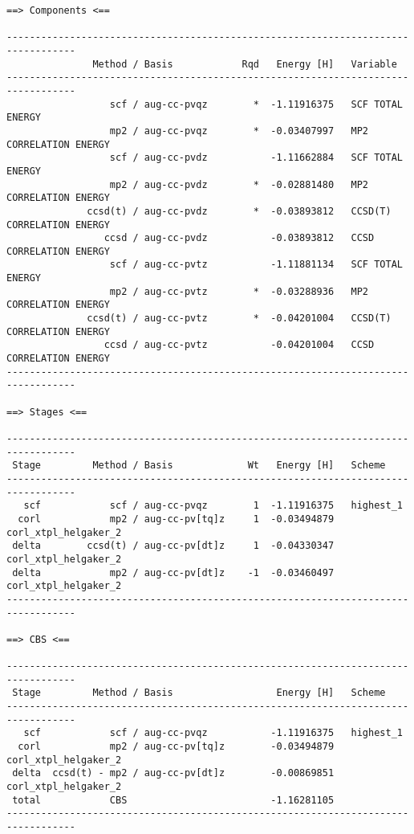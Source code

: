 \begin{scriptsize}
\begin{verbatim}
==> Components <==

----------------------------------------------------------------------------------
               Method / Basis            Rqd   Energy [H]   Variable
----------------------------------------------------------------------------------
                  scf / aug-cc-pvqz        *  -1.11916375   SCF TOTAL ENERGY
                  mp2 / aug-cc-pvqz        *  -0.03407997   MP2 CORRELATION ENERGY
                  scf / aug-cc-pvdz           -1.11662884   SCF TOTAL ENERGY
                  mp2 / aug-cc-pvdz        *  -0.02881480   MP2 CORRELATION ENERGY
              ccsd(t) / aug-cc-pvdz        *  -0.03893812   CCSD(T) CORRELATION ENERGY
                 ccsd / aug-cc-pvdz           -0.03893812   CCSD CORRELATION ENERGY
                  scf / aug-cc-pvtz           -1.11881134   SCF TOTAL ENERGY
                  mp2 / aug-cc-pvtz        *  -0.03288936   MP2 CORRELATION ENERGY
              ccsd(t) / aug-cc-pvtz        *  -0.04201004   CCSD(T) CORRELATION ENERGY
                 ccsd / aug-cc-pvtz           -0.04201004   CCSD CORRELATION ENERGY
----------------------------------------------------------------------------------

==> Stages <==

----------------------------------------------------------------------------------
 Stage         Method / Basis             Wt   Energy [H]   Scheme
----------------------------------------------------------------------------------
   scf            scf / aug-cc-pvqz        1  -1.11916375   highest_1
  corl            mp2 / aug-cc-pv[tq]z     1  -0.03494879   corl_xtpl_helgaker_2
 delta        ccsd(t) / aug-cc-pv[dt]z     1  -0.04330347   corl_xtpl_helgaker_2
 delta            mp2 / aug-cc-pv[dt]z    -1  -0.03460497   corl_xtpl_helgaker_2
----------------------------------------------------------------------------------

==> CBS <==

----------------------------------------------------------------------------------
 Stage         Method / Basis                  Energy [H]   Scheme
----------------------------------------------------------------------------------
   scf            scf / aug-cc-pvqz           -1.11916375   highest_1
  corl            mp2 / aug-cc-pv[tq]z        -0.03494879   corl_xtpl_helgaker_2
 delta  ccsd(t) - mp2 / aug-cc-pv[dt]z        -0.00869851   corl_xtpl_helgaker_2
 total            CBS                         -1.16281105
----------------------------------------------------------------------------------
\end{verbatim}
\end{scriptsize}

